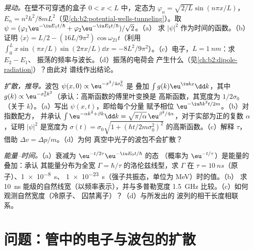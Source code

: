 \begin{exercise}[$\star\star\star$]\label{exo:b2:schrodinger-wave-functions:10}
\emph{晃动。}在壁不可穿透的盒子 $0 < x < L$ 中，定态为
$\varphi_n = \sqrt{2/L}\sin(n\pi x/L)$，$E_n =
n^2h^2/8mL^2$（见\cref{ch:b2:potential-wells-tunneling}）。取 $\psi =
(\varphi_1\eu^{-\iu E_1t/\hbar} + \varphi_2\eu^{-\iu E_2t/\hbar})/\sqrt2$。（a）
求 $|\psi|^2$ 作为时间的函数。（b）证明 $\langle x\rangle = L/2 -
(16L/9\pi^2)\cos\omega_{21}t$（利用 $\int_0^L x\sin(\pi x/L)\sin(2\pi x/L)\dd x
= -8L^2/9\pi^2$）。（c）电子，$L = \qty{1}{nm}$：求 $E_2 - E_1$、
振荡的频率与波长。（d）振荡的电荷会
产生什么（见\cref{ch:b2:dipole-radiation}）？由此对
谱线作出结论。
\end{exercise}

\begin{exercise}[$\star\star\star$]\label{exo:b2:schrodinger-wave-functions:11}
\emph{扩散，推导。}波包 $\psi(x,0) \propto \eu^{-x^2/4\sigma_0^2}$ 是
叠加 $\int g(k)\eu^{\iu kx}\dd k$，其中 $g(k) \propto
\eu^{-\sigma_0^2k^2}$（承认：高斯函数的傅里叶变换是
高斯函数，其宽度为 $1/2\sigma_0$（关于 $k$）。（a）写出 $\psi(x,t)$，即给每个分量
赋予相位 $\eu^{-\iu\hbar k^2t/2m}$。（b）对指数配方，
并承认 $\int\eu^{-\alpha k^2 + \beta k}\dd k = \sqrt{\pi/\alpha}\,
\eu^{\beta^2/4\alpha}$，对于实部为正的复数 $\alpha$，证明
$|\psi|^2$ 是宽度为 $\sigma(t) = \sigma_0\sqrt{1 + (\hbar t/2m
\sigma_0^2)^2}$ 的高斯函数。（c）解释 $\tau$，借助 $\Delta v = \Delta p/m$。（d）为何
真空中光子的波包不会扩散？
\end{exercise}

\begin{exercise}[$\star\star\star$]\label{exo:b2:schrodinger-wave-functions:12}
\emph{能量–时间。}（a）衰减为 $\eu^{-t/2\tau}\eu^{-\iu E_0t/\hbar}$ 的态
（概率为 $\eu^{-t/\tau}$）是能量的叠加：承认
其能量分布为全宽 $\Gamma =
\hbar/\tau$ 的洛伦兹线型，求 $\Gamma$ 在 $\tau = \qty{10}{ns}$（原子）、\qty{1e-8}{s}、
\qty{1e-23}{s}（强子共振态，单位为 MeV）时的值。（b）
求 \qty{10}{ns} 能级的自然线宽（以频率表示），并与多普勒宽度
\qty{1.5}{GHz} 比较。（c）如何观测自然宽度（冷原子、
囚禁离子）？（d）与所发出的
波列的相干长度相联系。
\end{exercise}

\section{问题：管中的电子与波包的扩散}


